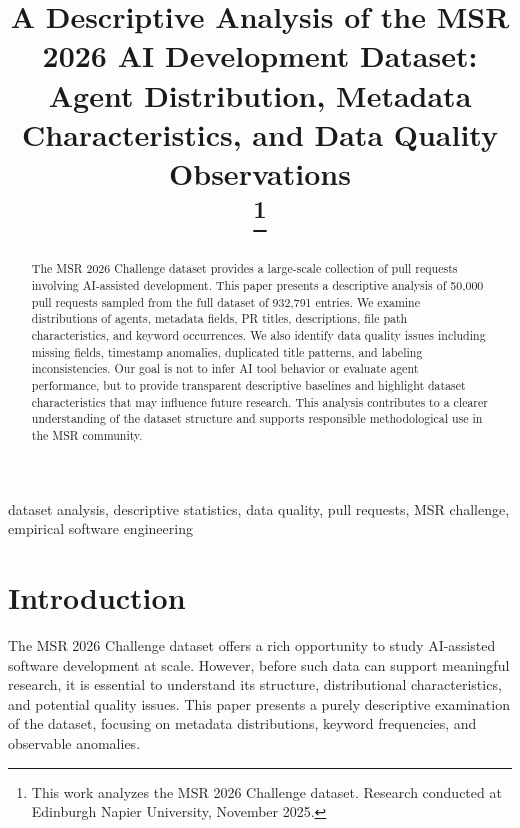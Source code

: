 \documentclass[conference]{IEEEtran}
\begin{document}
\title{A Descriptive Analysis of the MSR 2026 AI Development Dataset: Agent Distribution, Metadata Characteristics, and Data Quality Observations\\
\thanks{This work analyzes the MSR 2026 Challenge dataset. Research conducted at Edinburgh Napier University, November 2025.}
}

\author{
}

\maketitle

\begin{abstract}
The MSR 2026 Challenge dataset provides a large-scale collection of pull requests involving AI-assisted development. This paper presents a descriptive analysis of 50,000 pull requests sampled from the full dataset of 932,791 entries. We examine distributions of agents, metadata fields, PR titles, descriptions, file path characteristics, and keyword occurrences. We also identify data quality issues including missing fields, timestamp anomalies, duplicated title patterns, and labeling inconsistencies. Our goal is not to infer AI tool behavior or evaluate agent performance, but to provide transparent descriptive baselines and highlight dataset characteristics that may influence future research. This analysis contributes to a clearer understanding of the dataset structure and supports responsible methodological use in the MSR community.
\end{abstract}

\begin{IEEEkeywords}
dataset analysis, descriptive statistics, data quality, pull requests, MSR challenge, empirical software engineering
\end{IEEEkeywords}

\section{Introduction}

The MSR 2026 Challenge dataset offers a rich opportunity to study AI-assisted software development at scale. However, before such data can support meaningful research, it is essential to understand its structure, distributional characteristics, and potential quality issues. This paper presents a purely descriptive examination of the dataset, focusing on metadata distributions, keyword frequencies, and observable anomalies.
\end{document}

